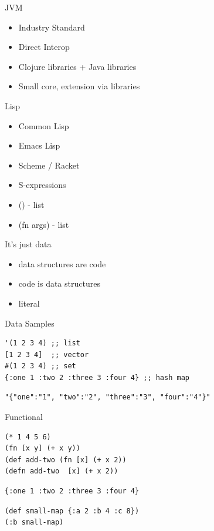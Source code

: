 \documentclass[bigger]{beamer}
\begin{document}
\begin{frame}[label={sec:orgae54612}]{JVM}
\begin{itemize}
\item Industry Standard
\item Direct Interop
\item Clojure libraries + Java libraries
\item Small core, extension via libraries
\end{itemize}
\end{frame}

\begin{frame}[label={sec:org72e6791}]{Lisp}
\begin{itemize}
\item Common Lisp
\item Emacs Lisp
\item Scheme / Racket
\end{itemize}
\begin{itemize}
\item S-expressions
\item () - list
\item (fn args) - list
\end{itemize}
\end{frame}

\begin{frame}[label={sec:org2b098e4}]{It's just data}
\begin{itemize}
\item data structures are code
\item code is data structures
\item literal
\end{itemize}
\end{frame}
\begin{frame}[label={sec:org026dd98},fragile]{Data Samples}
 \begin{verbatim}
'(1 2 3 4) ;; list
[1 2 3 4]  ;; vector
#(1 2 3 4) ;; set
{:one 1 :two 2 :three 3 :four 4} ;; hash map
\end{verbatim}

\begin{verbatim}
"{"one":"1", "two":"2", "three":"3", "four":"4"}"
\end{verbatim}
\end{frame}

\begin{frame}[label={sec:orgc97496c},fragile]{Functional}
 \begin{verbatim}
(* 1 4 5 6)
(fn [x y] (+ x y))
(def add-two (fn [x] (+ x 2))
(defn add-two  [x] (+ x 2))
\end{verbatim}

\begin{verbatim}
{:one 1 :two 2 :three 3 :four 4}
\end{verbatim}

\begin{verbatim}
(def small-map {:a 2 :b 4 :c 8})
(:b small-map)
\end{verbatim}
\end{frame}
\end{document}
